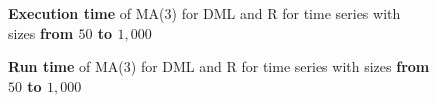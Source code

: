 \begin{figure}[ht]
	\centering
	\caption{\textbf{Execution time} of MA(3) for DML and R for time series with sizes \textbf{from $50$ to $1,000$} }
    \label{apx-fig:ma3-exectime-scatter-all_small}
\end{figure}

\begin{figure}[ht]
	\centering
	\caption{\textbf{Run time} of MA(3) for DML and R for time series with sizes \textbf{from $50$ to $1,000$}}
    \label{apx-fig:ma3-runtime-scatter-all_small}
\end{figure}


